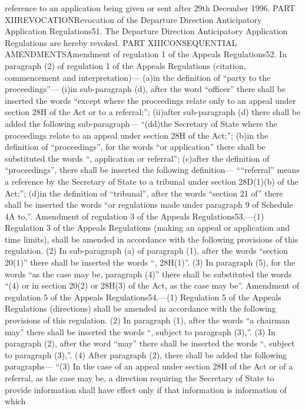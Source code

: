 \documentclass[a4paper]{article}
\begin{document}
reference to an application being given or sent after 29th December 1996.
PART XIIREVOCATIONRevocation of the Departure Direction Anticipatory Application
Regulations51. The Departure Direction Anticipatory Application Regulations are
hereby revoked.
PART XIIICONSEQUENTIAL AMENDMENTSAmendment of regulation 1 of the Appeals
Regulations52. In paragraph (2) of regulation 1 of the Appeals Regulations
(citation, commencement and interpretation)—
(a)in the definition of “party to the proceedings”—
(i)in sub-paragraph (d), after the word “officer” there shall be inserted the
words “except where the proceedings relate only to an appeal under section 28H
of the Act or to a referral;”;
(ii)after sub-paragraph (d) there shall be added the following sub-paragraph—
“(dd)the Secretary of State where the proceedings relate to an appeal under
section 28H of the Act;”;
(b)in the definition of “proceedings”, for the words “or application” there
shall be substituted the words “, application or referral”;
(c)after the definition of “proceedings”, there shall be inserted the following
definition—
““referral” means a reference by the Secretary of State to a tribunal under
section 28D(1)(b) of the Act;”;
(d)in the definition of “tribunal”, after the words “section 21 of” there shall
be inserted the words “or regulations made under paragraph 9 of Schedule 4A
to,”.
Amendment of regulation 3 of the Appeals Regulations53.—(1) Regulation 3 of the
Appeals Regulations (making an appeal or application and time limits), shall be
amended in accordance with the following provisions of this regulation.
(2) In sub-paragraph (a) of paragraph (1), after the words “section 20(1)” there
shall be inserted the words “, 28H(1)”.
(3) In paragraph (5), for the words “as the case may be, paragraph (4)” there
shall be substituted the words “(4) or in section 20(2) or 28H(3) of the Act, as
the case may be”.
Amendment of regulation 5 of the Appeals Regulations54.—(1) Regulation 5 of the
Appeals Regulations (directions) shall be amended in accordance with the
following provisions of this regulation.
(2) In paragraph (1), after the words “a chairman may” there shall be inserted
the words “, subject to paragraph (3),”.
(3) In paragraph (2), after the word “may” there shall be inserted the words “,
subject to paragraph (3),”.
(4) After paragraph (2), there shall be added the following paragraphs—
“(3) In the case of an appeal under section 28H of the Act or of a referral, as
the case may be, a direction requiring the Secretary of State to provide
information shall have effect only if that information is information of which
\end{document}
